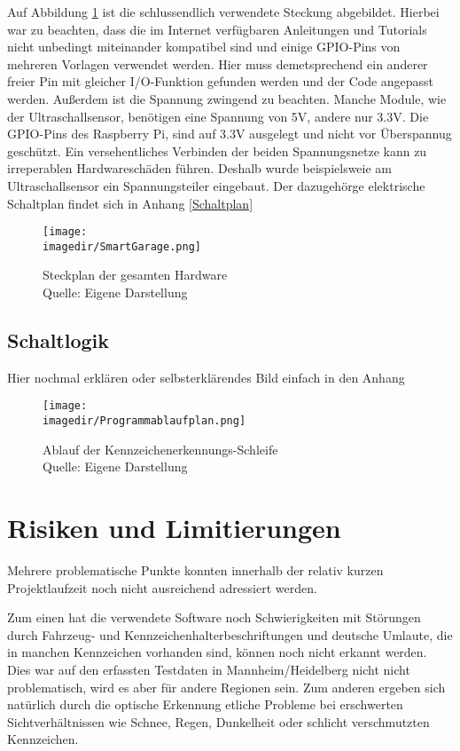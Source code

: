 Auf Abbildung \ref{Steckplansm} ist die schlussendlich verwendete Steckung abgebildet. Hierbei war zu beachten, dass die im Internet verfügbaren Anleitungen und Tutorials nicht unbedingt miteinander kompatibel sind und einige \ac{GPIO}-Pins von mehreren Vorlagen verwendet werden. Hier muss demetsprechend ein anderer freier Pin mit gleicher I/O-Funktion gefunden werden und der Code angepasst werden. Außerdem ist die Spannung zwingend zu beachten. Manche Module, wie der Ultraschallsensor, benötigen eine Spannung von 5V, andere nur 3.3V. Die GPIO-Pins des Raspberry Pi, sind auf 3.3V ausgelegt und nicht vor Überspannug geschützt. Ein versehentliches Verbinden der beiden Spannungsnetze kann zu irreperablen Hardwareschäden führen. Deshalb wurde beispielsweie am Ultraschallsensor ein Spannungsteiler eingebaut.
Der dazugehörge elektrische Schaltplan findet sich in Anhang \ref{Schaltplan}
\begin{figure}[H]
	\centering 
	\label{Steckplansm}
	\texttt{[image: \\imagedir/SmartGarage.png]}
	\captionsetup{format=hang}
	\caption[Steckplan]{\label{Steckplansm}Steckplan der gesamten Hardware \\Quelle: Eigene Darstellung}
\end{figure}\section{Schaltlogik}
Hier nochmal erklären oder selbsterklärendes Bild einfach in den Anhang
\begin{figure}[H]
	\centering 
	\texttt{[image: \\imagedir/Programmablaufplan.png]}
	\captionsetup{format=hang}
	\caption[Programmablauf]{\label{fig:test}Ablauf der Kennzeichenerkennungs-Schleife \\Quelle: Eigene Darstellung}
\end{figure}
\chapter{Risiken und Limitierungen}

Mehrere problematische Punkte konnten innerhalb der relativ kurzen Projektlaufzeit noch nicht ausreichend adressiert werden. 

Zum einen hat die verwendete Software noch Schwierigkeiten mit Störungen durch Fahrzeug- und Kennzeichenhalterbeschriftungen und deutsche Umlaute, die in manchen Kennzeichen vorhanden sind, können noch nicht erkannt werden. Dies war auf den erfassten Testdaten in Mannheim/Heidelberg nicht nicht problematisch, wird es aber für andere Regionen sein.
Zum anderen ergeben sich natürlich durch die optische Erkennung etliche Probleme bei erschwerten Sichtverhältnissen wie Schnee, Regen, Dunkelheit oder schlicht verschmutzten Kennzeichen. 

